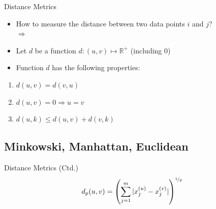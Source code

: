 \begin{frame}{Distance Metrics}{}
	\begin{itemize}
		\item How to measure the distance between two data points $i$ and $j$? \\
			$\Rightarrow$ 
		\item Let $d$ be a function $d : (u, v) \mapsto \mathbb{R}^{+}$ (including 0)
		\item Function $d$ has the following properties:
	\end{itemize}
	
	\begin{boxBlueNoFrame}
		\begin{enumerate}
			\item $d(u, v) = d(v, u)$ 
			\item $d(u, v) = 0 \Rightarrow u = v$
			\item $d(u, k) \le d(u, v) + d(v, k)$ 
		\end{enumerate}
	\end{boxBlueNoFrame}
\end{frame}


\subsection{Minkowski, Manhattan, Euclidean}

\begin{frame}{Distance Metrics (Ctd.)}{}
	\begin{equation}
		d_p(u, v) = \left( \sum_{j=1}^m \vert x_j^{(u)} - x_j^{(v)} \vert \right)^{\nicefrac{1}{p}}
	\end{equation}
	
\end{frame}



